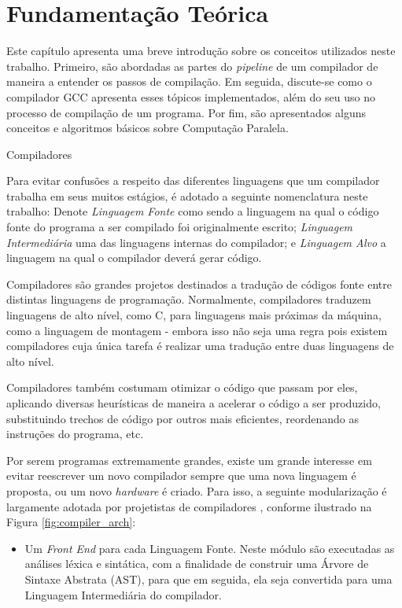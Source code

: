 \chapter{Fundamentação Teórica}
\label{chap:fundamentacao}

Este capítulo apresenta uma breve introdução sobre os conceitos utilizados neste
trabalho. Primeiro, são abordadas as partes do \textit{pipeline} de um compilador
de maneira a entender os passos de compilação.
Em seguida, discute-se como o compilador GCC apresenta esses tópicos implementados,
além do seu uso no processo de compilação de um programa. Por fim, são
apresentados alguns conceitos e algoritmos básicos sobre Computação Paralela.

\begin{section}{Compiladores}

Para evitar confusões a respeito das diferentes linguagens que um compilador
trabalha em seus muitos estágios, é adotado a seguinte nomenclatura neste trabalho:
Denote \textit{Linguagem Fonte} como sendo a linguagem
na qual o código fonte do programa a ser compilado foi originalmente escrito;
\textit{Linguagem Intermediária} uma das linguagens internas do compilador; e
\textit{Linguagem Alvo} a linguagem na qual o compilador deverá gerar código.

Compiladores são grandes projetos destinados a tradução de códigos fonte
entre distintas linguagens de programação. Normalmente, compiladores traduzem
linguagens de alto nível, como C, para linguagens mais próximas da máquina,
como a linguagem de montagem - embora isso não seja uma regra pois existem
compiladores cuja única tarefa é realizar uma tradução entre duas linguagens
de alto nível.

Compiladores também costumam otimizar
o código que passam por eles, aplicando diversas heurísticas de
maneira a acelerar o código a ser produzido, substituindo trechos de código por
outros mais eficientes, reordenando as instruções do programa, etc.

Por serem programas extremamente grandes, existe um grande interesse em evitar
reescrever um novo compilador
sempre que uma nova linguagem é proposta, ou um novo \textit{hardware} é criado.
Para isso, a seguinte modularização é largamente adotada por projetistas de
compiladores \citep{redhat} \citep{llvm}, conforme ilustrado na Figura \ref{fig:compiler_arch}:

\begin{itemize}
    \item Um \textit{Front End} para cada Linguagem Fonte.
	Neste módulo são executadas as análises léxica e sintática, com a
        finalidade de construir uma Árvore de Sintaxe Abstrata (AST), para que em
seguida, ela seja convertida para uma Linguagem Intermediária do compilador.


\end{itemize}
\end{section}
